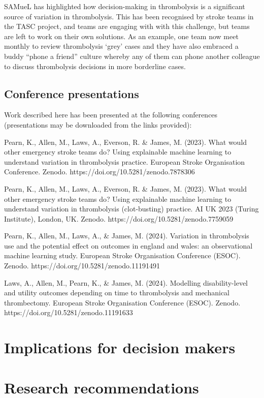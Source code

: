 SAMueL has highlighted how decision-making in thrombolysis is a significant source of variation in thrombolysis. This has been recognised by stroke teams in the TASC project, and teams are engaging with with this challenge, but teams are left to work on their own solutions. As an example, one team now meet monthly to review thrombolysis ‘grey’ cases and they have also embraced a buddy “phone a friend” culture whereby any of them can phone another colleague to discuss thrombolysis decisions in more borderline cases.

\subsection{Conference presentations}

Work described here has been presented at the following conferences (presentations may be downloaded from the links provided):

Pearn, K., Allen, M., Laws, A., Everson, R. \& James, M. (2023). What would other emergency stroke teams do? Using explainable machine learning to understand variation in thrombolysis practice. European Stroke Organisation Conference. Zenodo. https://doi.org/10.5281/zenodo.7878306

Pearn, K., Allen, M., Laws, A., Everson, R. \& James, M. (2023). What would other emergency stroke teams do? Using explainable machine learning to understand variation in thrombolysis (clot-busting) practice. AI UK 2023 (Turing Institute), London, UK. Zenodo. https://doi.org/10.5281/zenodo.7759059

Pearn, K., Allen, M., Laws, A., \& James, M. (2024). Variation in thrombolysis use and the potential effect on outcomes in england and wales: an observational machine learning study. European Stroke Organisation Conference (ESOC). Zenodo. https://doi.org/10.5281/zenodo.11191491

Laws, A., Allen, M., Pearn, K., \& James, M. (2024). Modelling disability-level and utility outcomes depending on time to thrombolysis and mechanical thrombectomy. European Stroke Organisation Conference (ESOC). Zenodo. https://doi.org/10.5281/zenodo.11191633

\section{Implications for decision makers}

\section{Research recommendations}

